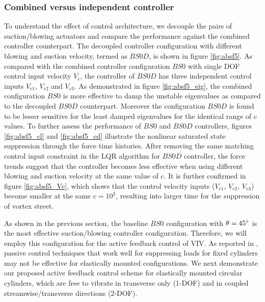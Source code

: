 \documentclass[standard]{jfm}
\begin{document}
\subsubsection{Combined versus independent controller}\label{sec:independent_control}
To understand the effect of control architecture, 
we decouple the pairs of suction/blowing actuators and compare the performance 
against the combined controller counterpart.
The decoupled controller configuration with different blowing and suction velocity, 
termed as $BS0D$, is shown in figure \ref{fig:absf5}. 
As compared with the combined controller configuration 
$BS0$ with single DOF control input velocity $V_c$, 
the controller of $BS0D$ has three independent control inputs $V_{c1}$, $V_{c2}$ and $V_{c3}$. 
As demonstrated in figure \ref{fig:absf5_eig}, the combined configuration $BS0$ 
is more effective to damp the unstable eigenvalues as compared to the decoupled $BS0D$ 
counterpart. Moreover the configuration $BS0D$ is found to be lesser sensitive for the 
least damped eigenvalues for the identical range of $c$ values. 
%
To further assess the performance of $BS0$ and $BS0D$ controllers, 
figures \ref{fig:absf5_cl} and \ref{fig:absf5_cd}
illustrate the nonlinear saturated state suppression through the force time histories. 
After removing the same matching control input constraint in the LQR algorithm 
for $BS0D$ controller, the force trends suggest that the controller becomes less
effective when using different blowing and suction velocity at the same value of $c$.
It is further confirmed in figure \ref{fig:absf5_Vc}, which shows 
that the control velocity inputs
($V_{c1}$, $V_{c2}$, $V_{c3}$) become smaller at the same $c=10^2$, 
resulting into larger time for the suppression of vortex street. 

As shown in the previous section, the baseline $BS0$ configuration with $\theta=45 \degree$ is 
the most effective suction/blowing controller configuration. 
Therefore, we will employ this configuration for the active feedback control of VIV.
%
As reported in \cite{owen2001}, passive control 
techniques that work well for suppressing loads for fixed cylinders may 
not be effective for elastically mounted configurations.
%
We next demonstrate our proposed active feedback control scheme for elastically 
mounted circular cylinders, which are free to vibrate 
in transverse only (1-DOF) and in coupled streamwise/transverse directions (2-DOF).
\end{document}
